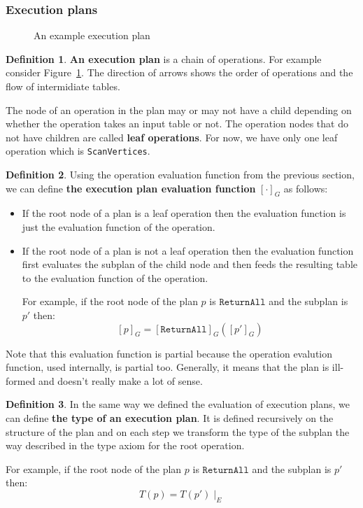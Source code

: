 \documentclass[14pt]{constructor-thesis}
\theoremstyle{definition}
\newtheorem{definition}{Definition}
\begin{document}
\subsubsection{Execution plans}

\begin{figure}
  \centering
  
  \caption{An example execution plan}
  \label{fig:example-execution-plan}
\end{figure}

\begin{definition}
  \textbf{An execution plan} is a chain of operations. For example consider Figure~\ref{fig:example-execution-plan}. The direction of arrows shows the order of operations and the flow of intermidiate tables.

  The node of an operation in the plan may or may not have a child depending on whether the operation takes an input table or not. The operation nodes that do not have children are called \textbf{leaf operations}. For now, we have only one leaf operation which is \texttt{ScanVertices}.
\end{definition}

\begin{definition}
  Using the operation evaluation function from the previous section, we can define \textbf{the execution plan evaluation function} $[\cdot]_G$ as follows:
  \begin{itemize}
    \item If the root node of a plan is a leaf operation then the evaluation function is just the evaluation function of the operation.
    \item If the root node of a plan is not a leaf operation then the evaluation function first evaluates the subplan of the child node and then feeds the resulting table to the evaluation function of the operation.

    For example, if the root node of the plan $p$ is $\texttt{ReturnAll}$ and the subplan is $p'$ then:
    $$ [p]_G = [\texttt{ReturnAll}]_G ([p']_G) $$
  \end{itemize}
\end{definition}

Note that this evaluation function is partial because the operation evalution function, used internally, is partial too. Generally, it means that the plan is ill-formed and doesn't really make a lot of sense.

\begin{definition}
  In the same way we defined the evaluation of execution plans, we can define \textbf{the type of an execution plan}. It is defined recursively on the structure of the plan and on each step we transform the type of the subplan the way described in the type axiom for the root operation.
  
  For example, if the root node of the plan $p$ is $\texttt{ReturnAll}$ and the subplan is $p'$ then:
    $$ T(p) = T(p') \mid_E $$
\end{definition}
\end{document}
